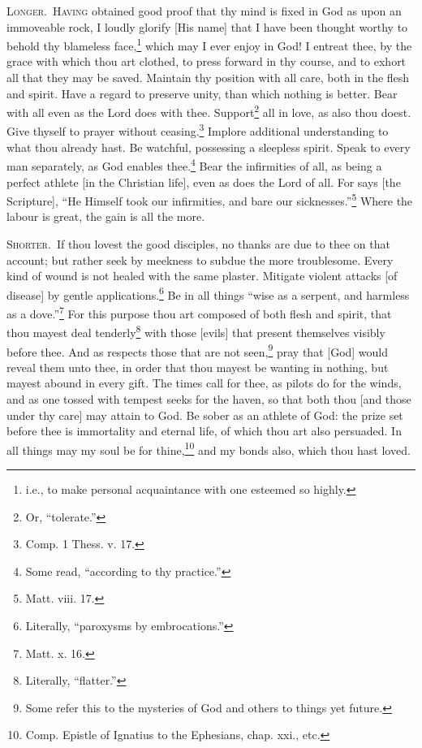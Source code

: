\textsc{Longer.}~\textsc{Having} obtained good proof that thy mind is fixed in God as upon an immoveable rock, I loudly glorify [His name] that I have been thought worthy to behold thy blameless face,\footnote{i.e., to make personal acquaintance with one esteemed so highly.} which may I ever enjoy in God! I entreat thee, by the grace with which thou art clothed, to press forward in thy course, and to exhort all that they may be saved. Maintain thy position with all care, both in the flesh and spirit. Have a regard to preserve unity, than which nothing is better. Bear with all even as the Lord does with thee. Support\footnote{Or, “tolerate.”} all in love, as also thou doest. Give thyself to prayer without ceasing.\footnote{Comp. 1 Thess. v. 17.} Implore additional understanding to what thou already hast. Be watchful, possessing a sleepless spirit. Speak to every man separately, as God enables thee.\footnote{Some read, “according to thy practice.”} Bear the infirmities of all, as being a perfect athlete [in the Christian life], even as does the Lord of all. For says [the Scripture], “He Himself took our infirmities, and bare our sicknesses.”\footnote{Matt. viii. 17.} Where the labour is great, the gain is all the more.


\textsc{Shorter.}~If thou lovest the good disciples, no thanks are due to thee on that account; but rather seek by meekness to subdue the more troublesome. Every kind of wound is not healed with the same plaster. Mitigate violent  attacks [of disease] by gentle applications.\footnote{Literally, “paroxysms by embrocations.”} Be in all things “wise as a serpent, and harmless as a dove.”\footnote{Matt. x. 16.} For this purpose thou art composed of both flesh and spirit, that thou mayest deal tenderly\footnote{Literally, “flatter.”} with those [evils] that present themselves visibly before thee. And as respects those that are not seen,\footnote{Some refer this to the mysteries of God and others to things yet future.} pray that [God] would reveal them unto thee, in order that thou mayest be wanting in nothing, but mayest abound in every gift. The times call for thee, as pilots do for the winds, and as one tossed with tempest seeks for the haven, so that both thou [and those under thy care] may attain to God. Be sober as an athlete of God: the prize set before thee is immortality and eternal life, of which thou art also persuaded. In all things may my soul be for thine,\footnote{Comp. Epistle of Ignatius to the Ephesians, chap. xxi., etc.} and my bonds also, which thou hast loved.

